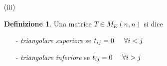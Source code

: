 \documentclass[a4paper, 12pt]{article}
\theoremstyle{definition}
\newtheorem{defn}[thm]{Definizione}
\begin{document}
\newpage

\begin{itemize}
     \item [(iii)] \begin{defn} Una matrice $T \in M_K(n,n)$ si dice \begin{itemize}
        \item [-] \textit{triangolare superiore} se $t_{ij} = 0 \hspace{0.5cm} \forall i < j$
        \item [-] \textit{triangolare inferiore} se $t_{ij} = 0 \hspace{0.5cm} \forall i > j$
     \end{itemize}
     \end{defn}
\end{itemize}

    
\end{document}
